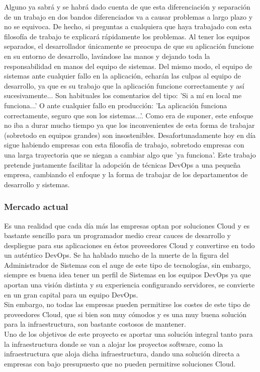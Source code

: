 \begin{text}
		Alguno ya sabrá y se habrá dado cuenta de que esta diferenciación y separación de un trabajo en dos bandos diferenciados va a causar problemas a largo plazo y no se equivoca. De hecho, si preguntas a cualquiera que haya trabajado con esta filosofía de trabajo te explicará rápidamente los problemas. Al tener los equipos separados, el desarrollador únicamente se preocupa de que su aplicación funcione en su entorno de desarrollo, lavándose las manos y dejando toda la responsabilidad en manos del equipo de sistemas. Del mismo modo, el equipo de sistemas ante cualquier fallo en la aplicación, echarán las culpas al equipo de desarrollo, ya que es su trabajo que la aplicación funcione correctamente y así sucesivamente... Son habituales los comentarios del tipo: 'Si a mí en local me funciona...' O ante cualquier fallo en producción: 'La aplicación funciona correctamente, seguro que son los sistemas...'. Como era de suponer, este enfoque no iba a durar mucho tiempo ya que los inconvenientes de esta forma de trabajar (sobretodo en equipos grandes) son insostenibles. Desafortunadamente hoy en día sigue habiendo empresas con esta filosofía de trabajo, sobretodo empresas con una larga trayectoria que se niegan a cambiar algo que 'ya funciona'. Este trabajo pretende justamente facilitar la adopción de técnicas DevOps a una pequeña empresa, cambiando el enfoque y la forma de trabajar de los departamentos de desarrollo y sistemas.
	\end{text}
	
	\subsubsection{Mercado actual}
		\begin{text}
			Es una realidad que cada día más las empresas optan por soluciones Cloud y es bastante sencillo para un programador medio crear cauces de desarrollo y despliegue para sus aplicaciones en éstos proveedores Cloud y convertirse en todo un auténtico DevOps. Se ha hablado mucho de la muerte de la figura del Administrador de Sistemas con el auge de este tipo de tecnologías, sin embargo, siempre es buena idea tener un perfil de Sistemas en los equipos DevOps ya que aportan una visión distinta y su experiencia configurando servidores, se convierte en un gran capital para un equipo DevOps. \\ 
			Sin embargo, no todas las empresas pueden permitirse los costes de este tipo de proveedores Cloud, que si bien son muy cómodos y es una muy buena solución para la infraestructura, son bastante costosos de mantener. \\
			Uno de los objetivos de este proyecto es aportar una solución integral tanto para la infraestructura donde se van a alojar los proyectos software, como la infraestructura que aloja dicha infraestructura, dando una solución directa a empresas con bajo presupuesto que no pueden permitirse soluciones Cloud. \\
		\end{text}
	
